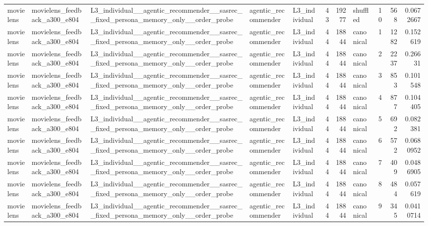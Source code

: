 \begin{table}[htbp!]
\begin{tabular}{lllllrrlrrr}
movielens & movielens\_feedback\_a300\_e804 & L3\_individual\_\_agentic\_recommender\_\_sasrec\_\_fixed\_persona\_memory\_only\_\_order\_probe & agentic\_recommender & L3\_individual & 43 & 19277 & shuffled & 10 & 568 & 0.0672667 \\
movielens & movielens\_feedback\_a300\_e804 & L3\_individual\_\_agentic\_recommender\_\_sasrec\_\_fixed\_persona\_memory\_only\_\_order\_probe & agentic\_recommender & L3\_individual & 44 & 18844 & canonical & 1 & 1282 & 0.152619 \\
movielens & movielens\_feedback\_a300\_e804 & L3\_individual\_\_agentic\_recommender\_\_sasrec\_\_fixed\_persona\_memory\_only\_\_order\_probe & agentic\_recommender & L3\_individual & 44 & 18844 & canonical & 2 & 2237 & 0.26631 \\
movielens & movielens\_feedback\_a300\_e804 & L3\_individual\_\_agentic\_recommender\_\_sasrec\_\_fixed\_persona\_memory\_only\_\_order\_probe & agentic\_recommender & L3\_individual & 44 & 18844 & canonical & 3 & 853 & 0.101548 \\
movielens & movielens\_feedback\_a300\_e804 & L3\_individual\_\_agentic\_recommender\_\_sasrec\_\_fixed\_persona\_memory\_only\_\_order\_probe & agentic\_recommender & L3\_individual & 44 & 18844 & canonical & 4 & 877 & 0.104405 \\
movielens & movielens\_feedback\_a300\_e804 & L3\_individual\_\_agentic\_recommender\_\_sasrec\_\_fixed\_persona\_memory\_only\_\_order\_probe & agentic\_recommender & L3\_individual & 44 & 18844 & canonical & 5 & 692 & 0.082381 \\
movielens & movielens\_feedback\_a300\_e804 & L3\_individual\_\_agentic\_recommender\_\_sasrec\_\_fixed\_persona\_memory\_only\_\_order\_probe & agentic\_recommender & L3\_individual & 44 & 18844 & canonical & 6 & 572 & 0.0680952 \\
movielens & movielens\_feedback\_a300\_e804 & L3\_individual\_\_agentic\_recommender\_\_sasrec\_\_fixed\_persona\_memory\_only\_\_order\_probe & agentic\_recommender & L3\_individual & 44 & 18844 & canonical & 7 & 409 & 0.0486905 \\
movielens & movielens\_feedback\_a300\_e804 & L3\_individual\_\_agentic\_recommender\_\_sasrec\_\_fixed\_persona\_memory\_only\_\_order\_probe & agentic\_recommender & L3\_individual & 44 & 18844 & canonical & 8 & 484 & 0.057619 \\
movielens & movielens\_feedback\_a300\_e804 & L3\_individual\_\_agentic\_recommender\_\_sasrec\_\_fixed\_persona\_memory\_only\_\_order\_probe & agentic\_recommender & L3\_individual & 44 & 18844 & canonical & 9 & 345 & 0.0410714 \\

\end{tabular}
\end{table}
